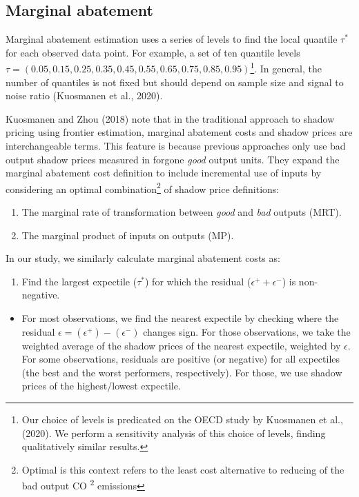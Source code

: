 \documentclass[
  10pt,
]{article}
\providecommand{\tightlist}{%
  \setlength{\itemsep}{0pt}\setlength{\parskip}{0pt}}
\begin{document}
\hypertarget{marginal-abatement}{%
\subsection{Marginal abatement}\label{marginal-abatement}}

Marginal abatement estimation uses a series of levels to find the local
quantile \(\tau^{*}\) for each observed data point. For example, a set
of ten quantile levels
\(\tau=(0.05,0.15,0.25,0.35,0.45,0.55,0.65,0.75,0.85,0.95)\)\footnote{Our choice of levels is predicated on the OECD study by Kuosmanen et al., (2020). We perform a sensitivity analysis of this choice of levels, finding qualitatively similar results.}. In general, the number of quantiles is not fixed but
should depend on sample size and signal to noise ratio (Kuosmanen et al., 2020). 

Kuosmanen and Zhou (2018) note that in the traditional approach to
shadow pricing using frontier estimation, marginal abatement costs and
shadow prices are interchangeable terms. This feature is because
previous approaches only use bad output shadow prices measured in
forgone \emph{good} output units. They expand the marginal abatement
cost definition to include incremental use of inputs by considering an
optimal combination\footnote{Optimal is this context refers to the least cost alternative to reducing of the bad output CO \textsuperscript{2} emissions} of shadow price definitions:

\begin{enumerate}
\def\labelenumi{\arabic{enumi}.}
\tightlist
\item
  The marginal rate of transformation between \emph{good} and \emph{bad}
  outputs (MRT).\\
\item
  The marginal product of inputs on outputs (MP).
\end{enumerate}

In our study, we similarly calculate marginal abatement costs as:

\begin{enumerate}
\def\labelenumi{\arabic{enumi}.}
\tightlist
\item
  Find the largest expectile (\(\tau^{*}\)) for which the residual
  (\(\epsilon^+ + \epsilon^-\)) is non-negative.
\end{enumerate}

\begin{itemize}
\tightlist
\item
  For most observations, we find the nearest expectile by checking where
  the residual \(\epsilon = (\epsilon^+) - (\epsilon^-)\) changes sign.
  For those observations, we take the weighted average of the shadow
  prices of the nearest expectile, weighted by \(\epsilon\). For some
  observations, residuals are positive (or negative) for all expectiles
  (the best and the worst performers, respectively). For those, we use
  shadow prices of the highest/lowest expectile.
\end{itemize}
\end{document}
